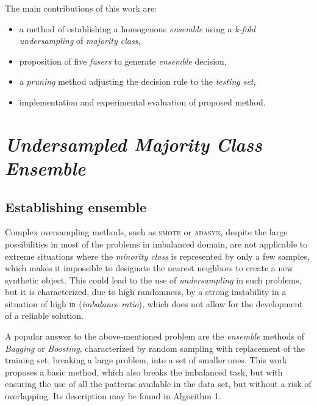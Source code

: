 \documentclass[pmlr]{jmlr}
\begin{document}
The main contributions of this work are:
\begin{itemize}
	\item a method of establishing a homogenous \emph{ensemble} using a \emph{k-fold undersampling} of \emph{majority class},
	\item proposition of five \emph{fusers} to generate \emph{ensemble} decision,
	\item a \emph{pruning} method adjusting the decision rule to the \emph{testing set},
	\item implementation and experimental evaluation of proposed method.
\end{itemize}

\section{\emph{Undersampled Majority Class Ensemble}}
\label{sec:intro}
\subsection{Establishing ensemble}

Complex oversampling methods, such as \textsc{smote} or \textsc{adasyn}, despite the large possibilities in most of the problems in imbalanced domain, are not applicable to extreme situations where the \emph{minority class} is represented by only a few samples, which makes it impossible to designate the nearest neighbors to create a new synthetic object. This could lead to the use of \emph{undersampling} in such problems, but it is characterized, due to high randomness, by a strong instability in a situation of high \textsc{ir} (\emph{imbalance ratio}), which does not allow for the development of a reliable solution.

A popular answer to the above-mentioned problem are the \emph{ensemble} methods of \emph{Bagging} or \emph{Boosting}, characterized by random sampling with replacement of the training set, breaking a large problem, into a set of smaller ones. This work proposes a basic method, which also breaks the imbalanced task, but with ensuring the use of all the patterns available in the data set, but without a risk of overlapping. Its description may be found in Algorithm 1.
\end{document}
